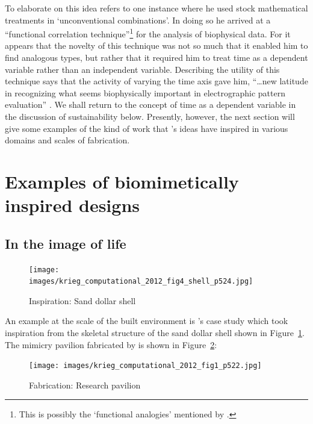 To elaborate on this idea \citeauthor{schmitt_signals_1963} refers to one instance where he used stock mathematical treatments in `unconventional combinations'. In doing so he arrived at a ``functional correlation technique''\footnote{This is possibly the `functional analogies' mentioned by \citet{vincent_biomimetics_2006}.} for the analysis of biophysical data. For \citeauthor{schmitt_signals_1963} it appears that the novelty of this technique was not so much that it enabled him to find analogous types, but rather that it required him to treat time as a dependent variable rather than an independent variable.  Describing the utility of this technique \citeauthor{schmitt_signals_1963} says that the activity of varying the time axis gave him, ``\dots new latitude in recognizing what seems biophysically important in electrographic pattern evaluation''  \cite[p.~91]{schmitt_signals_1963}. We shall return to the concept of time as a dependent variable in the discussion of sustainability below. Presently, however, the next section will give some examples of the kind of work that \citeauthor{schmitt_signals_1963}'s ideas have inspired in various domains and scales of fabrication.

\section{Examples of biomimetically inspired designs} 
\label{sec:biomimetic:examples}

\subsection{In the image of life}

\begin{figure}[H]
    \centering
    \texttt{[image: images/krieg\_computational\_2012\_fig4\_shell\_p524.jpg]}
    \caption{Inspiration: Sand dollar shell \cite[p.~524]{krieg_computational_2012}}
    \label{fig:krieg:2012:shell}
\end{figure}

An example at the scale of the built environment is \citet{krieg_computational_2012}'s case study which took inspiration from the skeletal structure of the sand dollar shell shown in Figure~\ref{fig:krieg:2012:shell}. The mimicry pavilion fabricated by \citeauthor{krieg_computational_2012} is shown in Figure~\ref{fig:krieg:2012:comp}:

\begin{figure}[H]
    \centering
    \texttt{[image: images/krieg\_computational\_2012\_fig1\_p522.jpg]}
    \caption{Fabrication: Research pavilion \cite[p.~522]{krieg_computational_2012}}
    \label{fig:krieg:2012:comp}
\end{figure}

